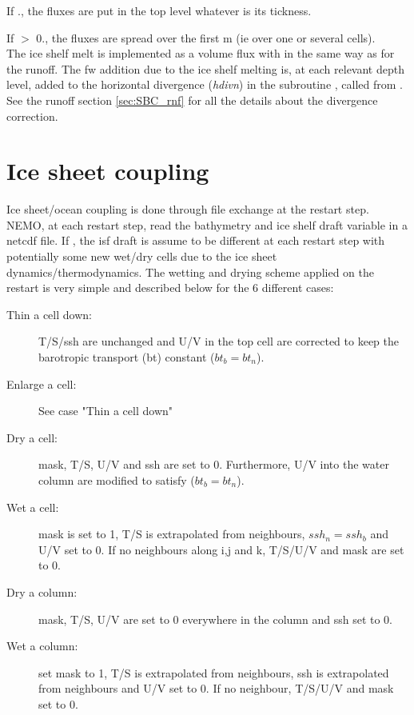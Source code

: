 \documentclass[../tex_main/NEMO_manual]{subfiles}
\begin{document}
If ., the fluxes are put in the top level whatever is its tickness. 

If  $>$ 0., the fluxes are spread over the first  m (ie over one or several cells).\\

The ice shelf melt is implemented as a volume flux with in the same way as for the runoff.
The fw addition due to the ice shelf melting is, at each relevant depth level, added to the horizontal divergence 
(\textit{hdivn}) in the subroutine , called from . 
See the runoff section \autoref{sec:SBC_rnf} for all the details about the divergence correction. 


\section{Ice sheet coupling}
\label{sec:SBC_iscpl}
Ice sheet/ocean coupling is done through file exchange at the restart step. NEMO, at each restart step, 
read the bathymetry and ice shelf draft variable in a netcdf file. 
If , the isf draft is assume to be different at each restart step 
with potentially some new wet/dry cells due to the ice sheet dynamics/thermodynamics.
The wetting and drying scheme applied on the restart is very simple and described below for the 6 different cases:
\begin{description}
\item[Thin a cell down:]
	T/S/ssh are unchanged and U/V in the top cell are corrected to keep the barotropic transport (bt) constant ($bt_b=bt_n$).
\item[Enlarge  a cell:]
	See case "Thin a cell down"
\item[Dry a cell:]
	mask, T/S, U/V and ssh are set to 0. Furthermore, U/V into the water column are modified to satisfy ($bt_b=bt_n$).
\item[Wet a cell:] 
	mask is set to 1, T/S is extrapolated from neighbours, $ssh_n = ssh_b$ and U/V set to 0. If no neighbours along i,j and k, T/S/U/V and mask are set to 0.
\item[Dry a column:]
	mask, T/S, U/V are set to 0 everywhere in the column and ssh set to 0.
\item[Wet a column:]
	set mask to 1, T/S is extrapolated from neighbours, ssh is extrapolated from neighbours and U/V set to 0. If no neighbour, T/S/U/V and mask set to 0.
\end{description}
\end{document}
